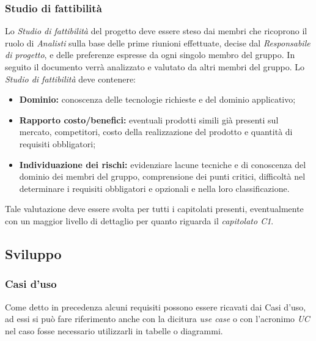 \documentclass[a4paper]{article}
\begin{document}
		\subsubsection{Studio di fattibilità}
		Lo \emph{Studio di fattibilità} del progetto deve essere steso dai membri che ricoprono il ruolo di
		\emph{Analisti} sulla base delle prime riunioni effettuate, decise dal \emph{Responsabile di progetto},
		e delle preferenze espresse da ogni singolo membro del gruppo.
		In seguito il documento verrà analizzato e valutato da altri membri del gruppo.
		Lo \emph{Studio di fattibilità} deve contenere:
		\begin{itemize}
			\item \textbf{Dominio:} conoscenza delle tecnologie richieste e del dominio applicativo;
			\item \textbf{Rapporto costo/benefici:} eventuali prodotti simili già presenti sul mercato,
			competitori, costo della
			realizzazione del prodotto e quantità di requisiti obbligatori;
			\item \textbf{Individuazione dei rischi:} evidenziare lacune tecniche e di conoscenza del dominio
			dei membri del gruppo, comprensione
			dei punti critici, difficoltà nel determinare i requisiti obbligatori e opzionali e nella loro
			classificazione.
		\end{itemize}
		Tale valutazione deve essere svolta per tutti i capitolati presenti, eventualmente con un maggior livello di dettaglio per quanto riguarda il \emph{capitolato C1}.

		\subsection{Sviluppo}
		
		\subsubsection{Casi d'uso}
			Come detto in precedenza alcuni requisiti possono essere ricavati dai Casi d'uso, ad essi si
			può fare riferimento anche con la dicitura \emph{use case} o con l'acronimo \emph{UC} nel caso
			fosse  necessario utilizzarli in tabelle o diagrammi.
\end{document}
